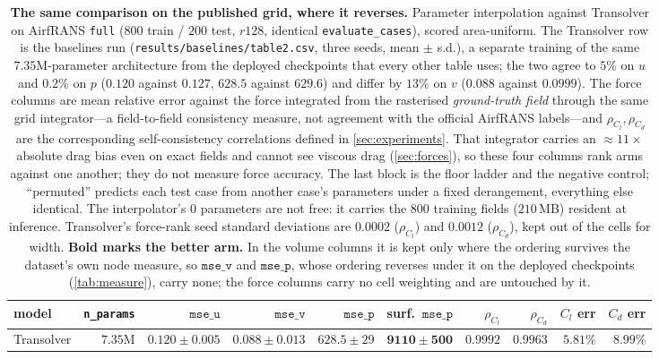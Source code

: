 \begin{table}[t]
\centering
\small
\caption{\textbf{The same comparison on the published grid, where it reverses.} Parameter
interpolation against Transolver on AirfRANS \texttt{full} ($800$ train / $200$ test,
$r128$, identical \texttt{evaluate\_cases}), scored area-uniform. The Transolver row is the
baselines run (\texttt{results\slash{}baselines\slash{}table2.csv}, three seeds, mean $\pm$ s.d.), a
separate training of the same $7.35$M-parameter architecture from the deployed checkpoints
that every other table uses; the two agree to $5\%$ on $u$ and $0.2\%$ on $p$ ($0.120$
against $0.127$, $628.5$ against $629.6$) and differ by $13\%$ on $v$ ($0.088$ against
$0.0999$).
The force columns are mean relative error against the force integrated from the
rasterised \emph{ground-truth field} through the same grid integrator---a field-to-field
consistency measure, not agreement with the official AirfRANS labels---and
$\rho_{C_l},\rho_{C_d}$ are the corresponding self-consistency correlations defined in
\autoref{sec:experiments}. That integrator carries an ${\approx}11\times$ absolute drag
bias even on exact fields and cannot see viscous drag (\autoref{sec:forces}), so these four
columns rank arms against one another; they do not measure force accuracy. The
last block is the floor ladder and the negative control; ``permuted'' predicts each test
case from another case's parameters under a fixed derangement, everything else identical.
The interpolator's $0$ parameters are not free: it carries the $800$ training fields
($210$\,MB) resident at inference. Transolver's force-rank seed standard deviations are
$0.0002$ ($\rho_{C_l}$) and $0.0012$ ($\rho_{C_d}$), kept out of the cells for width.
\textbf{Bold marks the better arm.} In the volume columns it is kept only where the
ordering survives the dataset's own node measure, so $\texttt{mse\_v}$ and
$\texttt{mse\_p}$, whose ordering reverses under it on the deployed checkpoints
(\autoref{tab:measure}), carry none; the force columns carry no cell weighting and are
untouched by it.}
\label{tab:interp}
\begin{adjustbox}{max width=\textwidth}
\begin{tabular}{l r r r r r r r r r}
\toprule
model & \texttt{n\_params} & $\texttt{mse\_u}$ & $\texttt{mse\_v}$ & $\texttt{mse\_p}$ & surf.\ $\texttt{mse\_p}$ & $\rho_{C_l}$ & $\rho_{C_d}$ & $C_l$ err & $C_d$ err \\
\midrule
Transolver & $7.35$M & $\mathbf{0.120{\pm}0.005}$ & $0.088{\pm}0.013$ & $628.5{\pm}29$ & $\mathbf{9110{\pm}500}$ & $0.9992$ & $0.9963$ & $5.81\%$ & $8.99\%$ \\

\end{tabular}
\end{adjustbox}
\end{table}
